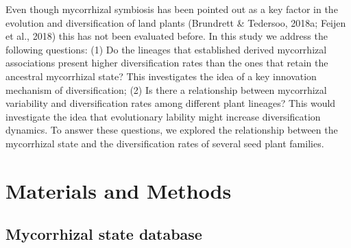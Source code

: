 \documentclass[12pt,]{article}
\begin{document}
Even though mycorrhizal symbiosis has been pointed out as a key factor
in the evolution and diversification of land plants (Brundrett \&
Tedersoo, 2018a; Feijen et al., 2018) this has not been evaluated
before. In this study we address the following questions: (1) Do the
lineages that established derived mycorrhizal associations present
higher diversification rates than the ones that retain the ancestral
mycorrhizal state? This investigates the idea of a key innovation
mechanism of diversification; (2) Is there a relationship between
mycorrhizal variability and diversification rates among different plant
lineages? This would investigate the idea that evolutionary lability
might increase diversification dynamics. To answer these questions, we
explored the relationship between the mycorrhizal state and the
diversification rates of several seed plant families.

\hypertarget{materials-and-methods}{%
\section{Materials and Methods}\label{materials-and-methods}}

\hypertarget{mycorrhizal-state-database}{%
\subsection{Mycorrhizal state
database}\label{mycorrhizal-state-database}}
\end{document}

